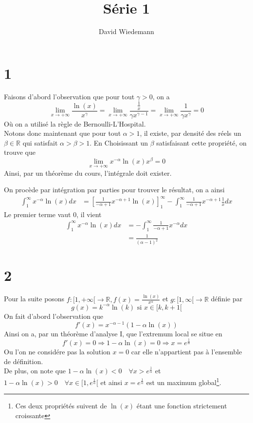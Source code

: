 \documentclass[11pt, a4paper]{article}
\begin{document}
\title{Série 1}
\author{David Wiedemann}
\maketitle
\section*{1}
Faisons d'abord l'observation que pour tout $\gamma>0$, on a
\[ 
	\lim_{x \to  + \infty} \frac{\ln( x) }{x^{\gamma}} = \lim_{x \to  + \infty} \frac{\frac{1}{x}}{\gamma x^{\gamma-1}} = \lim_{x \to  + \infty} \frac{1}{\gamma x^{\gamma}} = 0
\]
Où on a utilisé la règle de Bernoulli-L'Hospital.\\
Notons donc maintenant que pour tout $\alpha>1$, il existe, par densité des réels un $\beta \in \mathbb{R}$ qui satisfait $\alpha>\beta>1$.
En Choisissant un  $\beta$ satisfaisant cette propriété, on trouve que 
 \[ 
	 \lim_{x \to  + \infty} x^{-\alpha} \ln( x) x^{\beta} =0
\]
Ainsi, par un théorème du cours, l'intégrale doit exister.


On procède par intégration par parties pour trouver le résultat, on a ainsi
\begin{align*}
	\int_{ 1 }^{ \infty  } x^{-\alpha}\ln( x) dx &= \left[ \frac{1}{-\alpha+1}x^{-\alpha+1}\ln( x) \right]_{1}^{ \infty } - \int_{ 1 }^{ \infty  } \frac{1}{-\alpha+1}x^{-\alpha+1} \frac{1}{x} dx
\end{align*}
Le premier terme vaut 0, il vient
\begin{align*}
	\int_{ 1 }^{ \infty  } x^{-\alpha}\ln( x) dx &=  - \int_{ 1 }^{ \infty  } \frac{1}{-\alpha+1}x^{-\alpha}  dx\\
						     &=  \frac{1}{( \alpha-1) ^{2}} 
\end{align*}
\section*{2}
Pour la suite posons $f: [ 1, + \infty[ \to \mathbb{R},f(x) = \frac{\ln( x) }{x^{\alpha}}$ et $g:[1, \infty[ \to \mathbb{R}$ définie par
\[ 
	g( x) = k^{-\alpha}\ln( k)  \text{ si } x \in [ k,k+1[ 
\]
On fait d'abord l'observation que 
\[ 
	f'( x) = x^{-\alpha-1}\left( 1- \alpha \ln( x) \right) 
\]
Ainsi on a, par un théorème d'analyse I, que l'extremum local se situe en 
\[ 
	f'( x) =0 \Rightarrow 	1 - \alpha \ln( x) = 0 \Rightarrow x = e^{\frac{1}{\alpha}} 
\]
Ou l'on ne considére pas la solution $x=0$ car elle n'appartient pas à l'ensemble de définition.\\
De plus, on note que $1-\alpha \ln( x) <0 \quad \forall x> e^{\frac{1}{\alpha}}$ et $1-\alpha \ln( x) >0 \quad \forall x \in [ 1, e^{\frac{1}{\alpha}}[ $ et ainsi $x= e^{\frac{1}{\alpha}}$ est un maximum global\footnote{Ces deux propriétés suivent de $\ln( x) $ étant une fonction strictement croissante}.\\
\end{document}
